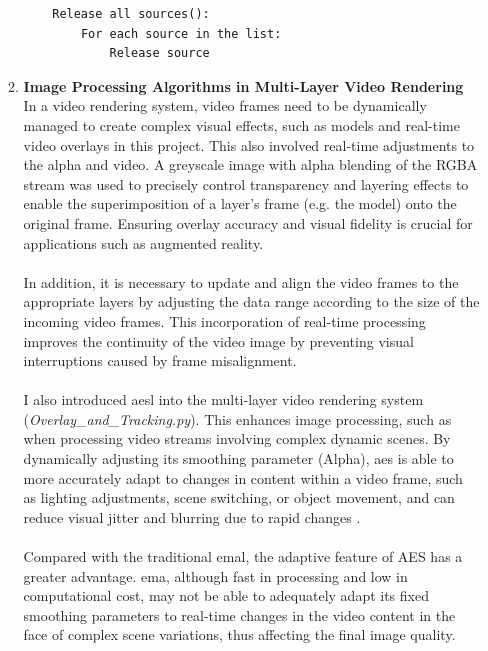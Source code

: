 \documentclass[12pt]{article}
\begin{document}
\begin{enumerate}
\begin{enumerate}
\begin{verbatim}
    Release all sources():
        For each source in the list:
            Release source
                        \end{verbatim}
                  \item \textbf{Image Processing Algorithms in Multi-Layer Video Rendering}
                        \\ In a video rendering system, video frames need to be dynamically managed to create complex visual effects, such as models and real-time video overlays in this project. This also involved real-time adjustments to the \gls{alpha}\cite{Alpha} and video. A greyscale image with alpha blending of the RGBA stream was used to precisely control transparency and layering effects to enable the superimposition of a layer's frame (e.g. the model) onto the original frame\cite{9979846}. Ensuring overlay accuracy and visual fidelity is crucial for applications such as augmented reality\cite{SETTIMI2022104272}.
                        \\\\
                        In addition, it is necessary to update and align the video frames to the appropriate layers by adjusting the data range according to the size of the incoming video frames. This incorporation of real-time processing improves the continuity of the video image by preventing visual interruptions caused by frame misalignment\cite{Wang}.
                        \\\\
                        I also introduced \gls{aesl} into the multi-layer video rendering system (\emph{Overlay\_and\_Tracking.py}). This enhances image processing, such as when processing video streams involving complex dynamic scenes\cite{7410724}. By dynamically adjusting its smoothing parameter (Alpha), \gls{aes} is able to more accurately adapt to changes in content within a video frame, such as lighting adjustments, scene switching, or object movement, and can reduce visual jitter and blurring due to rapid changes \cite{7410724}.
                        \\\\
                        Compared with the traditional \gls{emal}, the adaptive feature of AES has a greater advantage. \gls{ema}, although fast in processing and low in computational cost, may not be able to adequately adapt its fixed smoothing parameters to real-time changes in the video content in the face of complex scene variations, thus affecting the final image quality\cite{aes,aes2,InvestopediaEMA}.

\end{enumerate}
\end{enumerate}
\end{document}
